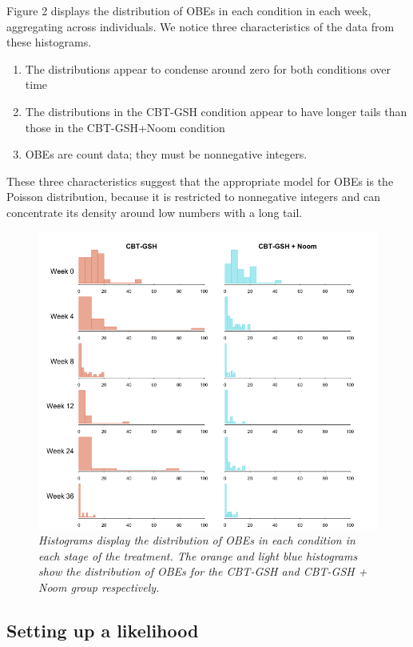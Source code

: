 \documentclass{article}
\begin{document}
Figure 2 displays the distribution of OBEs in each condition in each week, aggregating across individuals.  We notice three characteristics of the data from these histograms.
\begin{enumerate}
\item{The distributions appear to condense around zero for both conditions over time} 
\item{The distributions in the CBT-GSH condition appear to have longer tails than those in the CBT-GSH+Noom condition}
\item{OBEs are count data; they must be nonnegative integers.}
\end{enumerate}
These three characteristics suggest that the appropriate model for OBEs is the Poisson distribution, because it is restricted to nonnegative integers and can concentrate its density around low numbers with a long tail.
%
\begin{figure}[H]
\begin{center}
\includegraphics[width=\textwidth, height=\textheight, keepaspectratio]{noom_hist.png}
\end{center}
\caption{\emph{Histograms display the distribution of OBEs in each condition in each stage of the treatment. The orange and light blue histograms show the distribution of OBEs for the CBT-GSH and CBT-GSH  + Noom group respectively.}}
\end{figure}
%
\subsection*{Setting up a likelihood}
\end{document}

